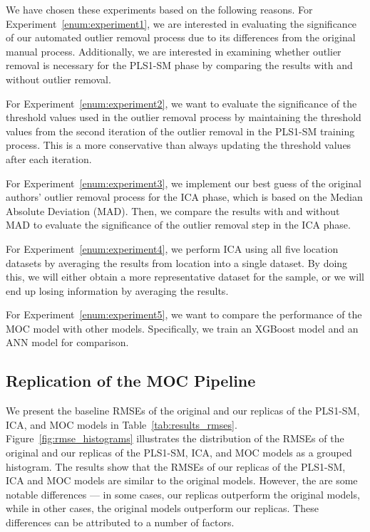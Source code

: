 \noindent
We have chosen these experiments based on the following reasons.
For Experiment~\ref{enum:experiment1}, we are interested in evaluating the significance of our automated outlier removal process due to its differences from the original manual process.
Additionally, we are interested in examining whether outlier removal is necessary for the PLS1-SM phase by comparing the results with and without outlier removal.

For Experiment~\ref{enum:experiment2}, we want to evaluate the significance of the threshold values used in the outlier removal process by maintaining the threshold values from the second iteration of the outlier removal in the PLS1-SM training process.
This is a more conservative than always updating the threshold values after each iteration.

For Experiment~\ref{enum:experiment3}, we implement our best guess of the original authors' outlier removal process for the ICA phase, which is based on the Median Absolute Deviation (MAD).
Then, we compare the results with and without MAD to evaluate the significance of the outlier removal step in the ICA phase.

For Experiment~\ref{enum:experiment4}, we perform ICA using all five location datasets by averaging the results from location into a single dataset.
By doing this, we will either obtain a more representative dataset for the sample, or we will end up losing information by averaging the results.

For Experiment~\ref{enum:experiment5}, we want to compare the performance of the MOC model with other models.
Specifically, we train an XGBoost model and an ANN model for comparison.

\subsection{Replication of the MOC Pipeline}\label{sec:replica_moc}
We present the baseline RMSEs of the original and our replicas of the PLS1-SM, ICA, and MOC models in Table~\ref{tab:results_rmses}.
Figure~\ref{fig:rmse_histograms} illustrates the distribution of the RMSEs of the original and our replicas of the PLS1-SM, ICA, and MOC models as a grouped histogram.
The results show that the RMSEs of our replicas of the PLS1-SM, ICA and MOC models are similar to the original models.
However, the are some notable differences --- in some cases, our replicas outperform the original models, while in other cases, the original models outperform our replicas.
These differences can be attributed to a number of factors.

